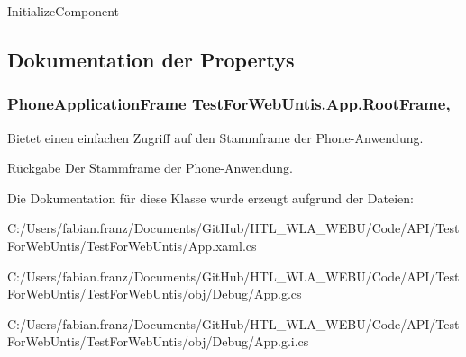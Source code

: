 Initialize\-Component 



\subsection{Dokumentation der Propertys}
\hypertarget{class_test_for_web_untis_1_1_app_a3de6c087bb9af076ec1ee6eaf47f5cfa}{
\subsubsection[{Root\-Frame}]{\setlength{\rightskip}{0pt plus 5cm}Phone\-Application\-Frame Test\-For\-Web\-Untis.\-App.\-Root\-Frame\hspace{0.3cm}{\ttfamily [get]}, {\ttfamily [set]}}}\label{class_test_for_web_untis_1_1_app_a3de6c087bb9af076ec1ee6eaf47f5cfa}


Bietet einen einfachen Zugriff auf den Stammframe der Phone-\/\-Anwendung. 

\begin{DoxyReturn}{Rückgabe}
Der Stammframe der Phone-\/\-Anwendung.
\end{DoxyReturn}


Die Dokumentation für diese Klasse wurde erzeugt aufgrund der Dateien\-:\begin{DoxyCompactItemize}
\item 
C\-:/\-Users/fabian.\-franz/\-Documents/\-Git\-Hub/\-H\-T\-L\-\_\-\-W\-L\-A\-\_\-\-W\-E\-B\-U/\-Code/\-A\-P\-I/\-Test\-For\-Web\-Untis/\-Test\-For\-Web\-Untis/App.\-xaml.\-cs\item 
C\-:/\-Users/fabian.\-franz/\-Documents/\-Git\-Hub/\-H\-T\-L\-\_\-\-W\-L\-A\-\_\-\-W\-E\-B\-U/\-Code/\-A\-P\-I/\-Test\-For\-Web\-Untis/\-Test\-For\-Web\-Untis/obj/\-Debug/App.\-g.\-cs\item 
C\-:/\-Users/fabian.\-franz/\-Documents/\-Git\-Hub/\-H\-T\-L\-\_\-\-W\-L\-A\-\_\-\-W\-E\-B\-U/\-Code/\-A\-P\-I/\-Test\-For\-Web\-Untis/\-Test\-For\-Web\-Untis/obj/\-Debug/App.\-g.\-i.\-cs\end{DoxyCompactItemize}
